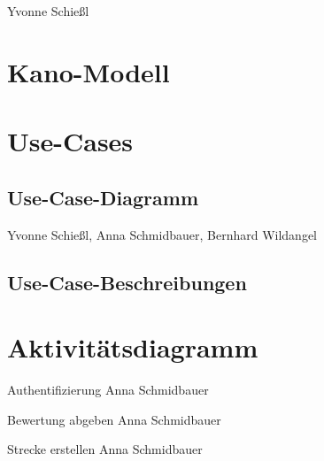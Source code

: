 \documentclass[a4paper, 12pp]{article}
\begin{document}
Yvonne Schießl

\section{Kano-Modell}
\section{Use-Cases}
\subsection{Use-Case-Diagramm}

\begin{figure}[H] 
\centering
	\fbox{\begin{minipage}{16cm} 
	\end{minipage}}
\end{figure}
Yvonne Schießl, Anna Schmidbauer, Bernhard Wildangel

\subsection{Use-Case-Beschreibungen}
\section{Aktivitätsdiagramm}

{\Large Authentifizierung}
Anna Schmidbauer
\begin{figure}[H] 
\centering
	\fbox{\begin{minipage}{16cm} 
	\end{minipage}}
\end{figure}


{\Large Bewertung abgeben}
Anna Schmidbauer
\begin{figure}[H] 
\centering
	\fbox{\begin{minipage}{16cm} 
	\end{minipage}}
\end{figure}

{\Large Strecke erstellen}
Anna Schmidbauer
\begin{figure}[H] 
\centering
	\fbox{\begin{minipage}{16cm} 
	\end{minipage}}
\end{figure}
\end{document}
